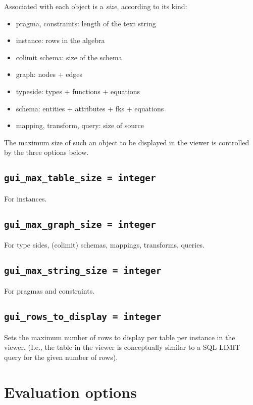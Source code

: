 \documentclass[10pt]{book}
\begin{document}
Associated with each object is a {\it size}, according to its kind:
\begin{itemize}
\item pragma, constraints: length of the text string
\item instance: rows in the algebra
\item colimit schema: size of the schema
\item graph: nodes + edges
\item typeside: types + functions + equations
\item schema: entities + attributes + fks + equations
\item mapping, transform, query: size of source
\end{itemize}

The maximum size of such an object to be displayed in the viewer is controlled by the three options below.

\subsection{{\tt gui\_max\_table\_size = integer}}

For instances.

\subsection{{\tt gui\_max\_graph\_size = integer}}

For type sides, (colimit) schemas, mappings, transforms, queries.

\subsection{{\tt gui\_max\_string\_size = integer}}

For pragmas and constraints.

\subsection{{\tt gui\_rows\_to\_display = integer}}

Sets the maximum number of rows to display per table per instance in the viewer.  (I.e., the table in the viewer is conceptually similar to a SQL LIMIT query for the given number of rows).

\section{Evaluation options}
\end{document}
